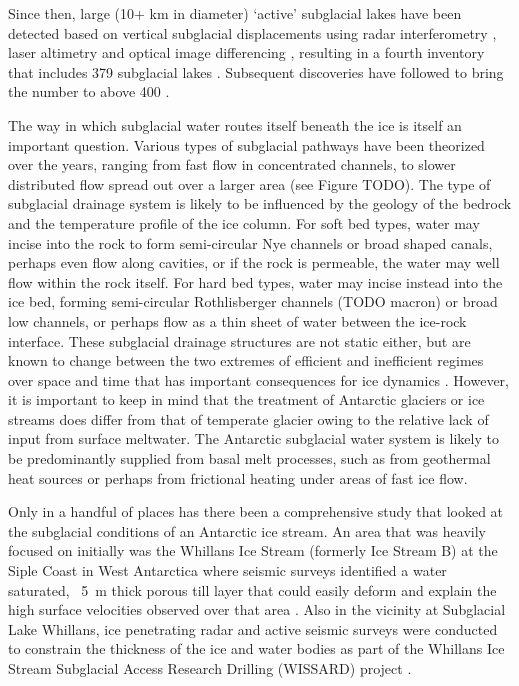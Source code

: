 Since then, large (10+ km in diameter) `active' subglacial lakes have been detected based on vertical subglacial displacements using radar interferometry \citep{GrayEvidencesubglacialwater2005}, laser altimetry \citep{Smithinventoryactivesubglacial2009} and optical image differencing \citep{FrickerActiveSubglacialWater2007}, resulting in a fourth inventory that includes 379 subglacial lakes \citep{WrightfourthinventoryAntarctic2012}.
Subsequent discoveries have followed to bring the number to above 400 \citep[e.g.][]{WrightEvidencehydrologicalconnection2012,WrightSubglacialhydrologicalconnectivity2014,KimActivesubglaciallakes2016,RiveraSubglacialLakeCECs2015,SmithConnectedsubglaciallake2017}.

The way in which subglacial water routes itself beneath the ice is itself an important question.
Various types of subglacial pathways have been theorized over the years, ranging from fast flow in concentrated channels, to slower distributed flow spread out over a larger area (see Figure TODO).
The type of subglacial drainage system is likely to be influenced by the geology of the bedrock and the temperature profile of the ice column.
For soft bed types, water may incise into the rock to form semi-circular Nye channels or broad shaped canals, perhaps even flow along cavities, or if the rock is permeable, the water may well flow within the rock itself.
For hard bed types, water may incise instead into the ice bed, forming semi-circular Rothlisberger channels (TODO macron) or broad low channels, or perhaps flow as a thin sheet of water between the ice-rock interface.
These subglacial drainage structures are not static either, but are known to change between the two extremes of efficient and inefficient regimes over space and time that has important consequences for ice dynamics \citep{MullerVelocityfluctuationswater1973}.
However, it is important to keep in mind that the treatment of Antarctic glaciers or ice streams does differ from that of temperate glacier owing to the relative lack of input from surface meltwater.
The Antarctic subglacial water system is likely to be predominantly supplied from basal melt processes, such as from geothermal heat sources or perhaps from frictional heating under areas of fast ice flow.

Only in a handful of places has there been a comprehensive study that looked at the subglacial conditions of an Antarctic ice stream.
An area that was heavily focused on initially was the Whillans Ice Stream (formerly Ice Stream B) at the Siple Coast in West Antarctica where seismic surveys identified a water saturated, ~\SI{5}{\metre} thick porous till layer \citep{BlankenshipSeismicmeasurementsreveal1986} that could easily deform and explain the high surface velocities observed over that area \citep{AlleyDeformationtillice1986}.
Also in the vicinity at Subglacial Lake Whillans, ice penetrating radar \citep{ChristiansonSubglacialLakeWhillans2012} and active seismic \citep{HorganSubglacialLakeWhillans2012} surveys were conducted to constrain the thickness of the ice and water bodies as part of the Whillans Ice Stream Subglacial Access Research Drilling (WISSARD) project \citep{TulaczykWISSARDSubglacialLake2014}.

